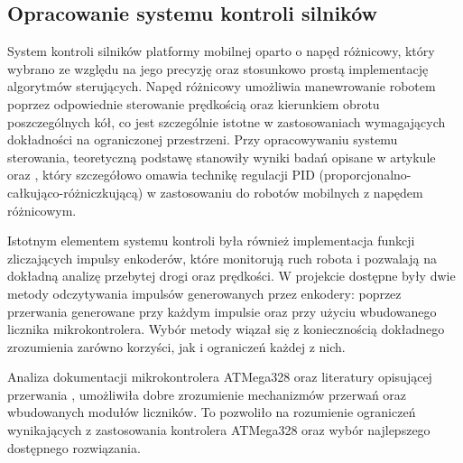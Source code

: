\subsection{Opracowanie systemu kontroli silników}
\label{sec:opracowanie-silnik}
System kontroli silników platformy mobilnej oparto o napęd różnicowy, który wybrano ze względu na jego precyzję oraz stosunkowo prostą implementację algorytmów sterujących. Napęd różnicowy umożliwia manewrowanie robotem poprzez odpowiednie sterowanie prędkością oraz kierunkiem obrotu poszczególnych kół, co jest szczególnie istotne w zastosowaniach wymagających dokładności na ograniczonej przestrzeni. Przy opracowywaniu systemu sterowania, teoretyczną podstawę stanowiły wyniki badań opisane w artykule \cite{bib:konferencja} oraz \cite{bib:encoders-pid}, który szczegółowo omawia technikę regulacji PID (proporcjonalno-całkująco-różniczkującą) w zastosowaniu do robotów mobilnych z napędem różnicowym. 

Istotnym elementem systemu kontroli była również implementacja funkcji zliczających impulsy enkoderów, które monitorują ruch robota i pozwalają na dokładną analizę przebytej drogi oraz prędkości. W projekcie dostępne były dwie metody odczytywania impulsów generowanych przez enkodery: poprzez przerwania generowane przy każdym impulsie oraz przy użyciu wbudowanego licznika mikrokontrolera. Wybór metody wiązał się z koniecznością dokładnego zrozumienia zarówno korzyści, jak i ograniczeń każdej z nich.

Analiza dokumentacji mikrokontrolera ATMega328 \cite{bib:manualarduino} oraz literatury opisującej przerwania \cite{bib:artykul1}, umożliwiła dobre zrozumienie mechanizmów przerwań oraz wbudowanych modułów liczników. To pozwoliło na rozumienie ograniczeń wynikających z zastosowania kontrolera ATMega328 oraz wybór najlepszego dostępnego rozwiązania. 


